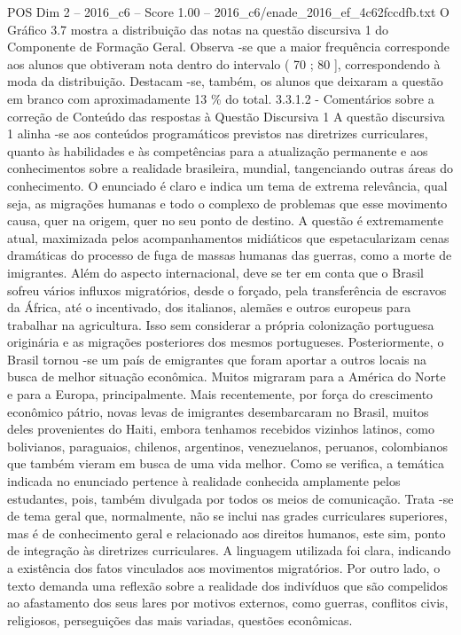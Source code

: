 \begin{textsample}{POS Dim 2 – 2016\_c6 – Score 1.00 – 2016\_c6/enade\_2016\_ef\_4c62fccdfb.txt}
O Gráfico 3.7 mostra a distribuição das notas na questão discursiva 1 do Componente de Formação Geral.
Observa -se que a maior frequência corresponde aos alunos que obtiveram nota dentro do intervalo ( 70 ; 80 ], correspondendo à moda da distribuição.
Destacam -se, também, os alunos que deixaram a questão em branco com aproximadamente 13 \% do total. 3.3.1.2 - Comentários sobre a correção de Conteúdo das respostas à Questão Discursiva 1 A questão discursiva 1 alinha -se aos conteúdos programáticos previstos nas diretrizes curriculares, quanto às habilidades e às competências para a atualização permanente e aos conhecimentos sobre a realidade brasileira, mundial, tangenciando outras áreas do conhecimento.
O enunciado é claro e indica um tema de extrema relevância, qual seja, as migrações humanas e todo o complexo de problemas que esse movimento causa, quer na origem, quer no seu ponto de destino.
A questão é extremamente atual, maximizada pelos acompanhamentos midiáticos que espetacularizam cenas dramáticas do processo de fuga de massas humanas das guerras, como a morte de imigrantes.
Além do aspecto internacional, deve se ter em conta que o Brasil sofreu vários influxos migratórios, desde o forçado, pela transferência de escravos da África, até o incentivado, dos italianos, alemães e outros europeus para trabalhar na agricultura.
Isso sem considerar a própria colonização portuguesa originária e as migrações posteriores dos mesmos portugueses.
Posteriormente, o Brasil tornou -se um país de emigrantes que foram aportar a outros locais na busca de melhor situação econômica.
Muitos migraram para a América do Norte e para a Europa, principalmente.
Mais recentemente, por força do crescimento econômico pátrio, novas levas de imigrantes desembarcaram no Brasil, muitos deles provenientes do Haiti, embora tenhamos recebidos vizinhos latinos, como bolivianos, paraguaios, chilenos, argentinos, venezuelanos, peruanos, colombianos que também vieram em busca de uma vida melhor.
Como se verifica, a temática indicada no enunciado pertence à realidade conhecida amplamente pelos estudantes, pois, também divulgada por todos os meios de comunicação.
Trata -se de tema geral que, normalmente, não se inclui nas grades curriculares superiores, mas é de conhecimento geral e relacionado aos direitos humanos, este sim, ponto de integração às diretrizes curriculares.
A linguagem utilizada foi clara, indicando a existência dos fatos vinculados aos movimentos migratórios.
Por outro lado, o texto demanda uma reflexão sobre a realidade dos indivíduos que são compelidos ao afastamento dos seus lares por motivos externos, como guerras, conflitos civis, religiosos, perseguições das mais variadas, questões econômicas.

\end{textsample}
